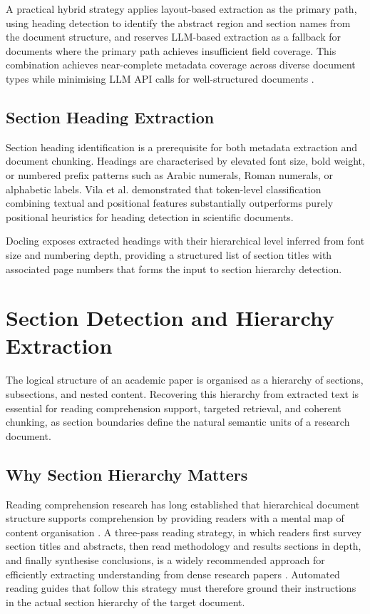 \documentclass[12pt,a4paper]{report}
\begin{document}
A practical hybrid strategy applies layout-based extraction 
as the primary path, using heading detection to identify the 
abstract region and section names from the document structure, 
and reserves LLM-based extraction as a fallback for documents 
where the primary path achieves insufficient field coverage. 
This combination achieves near-complete metadata coverage 
across diverse document types while minimising LLM API calls 
for well-structured documents \cite{docling2024}.

\subsection{Section Heading Extraction}

Section heading identification is a prerequisite for both 
metadata extraction and document chunking. Headings are 
characterised by elevated font size, bold weight, or 
numbered prefix patterns such as Arabic numerals, Roman 
numerals, or alphabetic labels. Vila et al. \cite{vila2021} 
demonstrated that token-level classification combining 
textual and positional features substantially outperforms 
purely positional heuristics for heading detection in 
scientific documents.

Docling exposes extracted headings with their hierarchical 
level inferred from font size and numbering depth, providing 
a structured list of section titles with associated page 
numbers that forms the input to section hierarchy detection.

\section{Section Detection and Hierarchy Extraction}

The logical structure of an academic paper is organised as a 
hierarchy of sections, subsections, and nested content. 
Recovering this hierarchy from extracted text is essential 
for reading comprehension support, targeted retrieval, and 
coherent chunking, as section boundaries define the natural 
semantic units of a research document.

\subsection{Why Section Hierarchy Matters}

Reading comprehension research has long established that 
hierarchical document structure supports comprehension by 
providing readers with a mental map of content organisation 
\cite{kintsch1978}. A three-pass reading strategy, in which 
readers first survey section titles and abstracts, then read 
methodology and results sections in depth, and finally 
synthesise conclusions, is a widely recommended approach for 
efficiently extracting understanding from dense research papers 
\cite{keshav2007}. Automated reading guides that follow this 
strategy must therefore ground their instructions in the 
actual section hierarchy of the target document.
\end{document}
